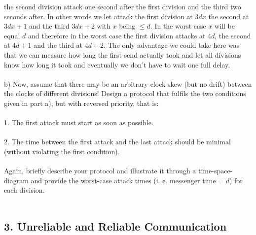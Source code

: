 \documentclass{article}
\begin{document}
the second division attack one second after the first division and the third two seconds after. In other 
words we let attack the first division at $3dx$ the second at $3dx + 1$ and the third $3dx + 2$ with $x$ 
being $\leq d$. In the worst case $x$ will be equal $d$ and therefore in the worst case the first 
division attacks at $4d$, the second at $4d + 1$ and the third at $4d + 2$. The only advantage we could 
take here was that we can measure how long the first send actually took and let all divisions know how 
long it took and eventually we don't have to wait one full delay.\\
\\
b) Now, assume that there may be an arbitrary clock skew (but no drift) between the clocks of different
divisions! Design a protocol that fulfils the two conditions given in part a), but with reversed priority,
that is:\\
\\
1. The first attack must start as soon as possible.\\
\\
2. The time between the first attack and the last attack should be minimal (without violating the first
condition).\\
\\
Again, briefly describe your protocol and illustrate it through a time-space-diagram and provide the
worst-case attack times (i. e. messenger time = $d$) for each division.\\
\\

\subsection*{3. Unreliable and Reliable Communication}
\end{document}
